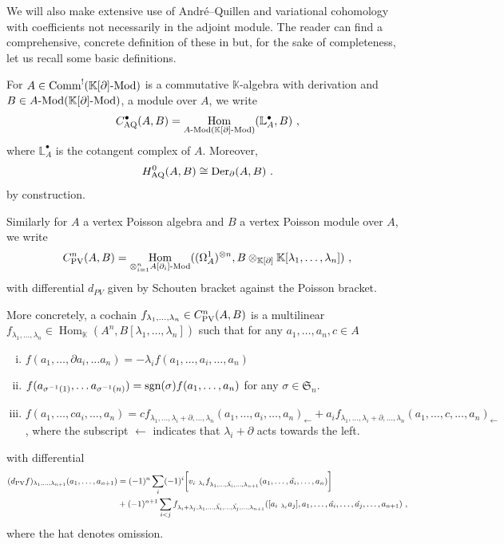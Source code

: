 \documentclass[11pt]{amsart}
\numberwithin{equation}{section}
\theoremstyle{definition}
\newcommand{\bb}{\mathbb}
\newcommand{\mf}{\mathfrak}
\newcommand{\AQ}{{\textup{AQ}}}
\DeclareMathOperator{\Hom}{Hom}
\newcommand{\Mod}{{\textup{-Mod}}}
\newcommand{\ik}{{\bb K}}
\newcommand{\Der}{{\textup{Der}}}
\newcommand{\Comm}{{\textup{Comm}}}
\newcommand{\Ss}{{{\mf{S}}}}
\newcommand{\PV}{{{\textup{PV}}}}
\newcommand{\0}{{\textbf{0}}}
\newcommand{\del}{{{\partial}}}
\def \mf{\mathfrak}
\begin{document}
We will also make extensive use of Andr\'e--Quillen and variational cohomology with coefficients not necessarily in the adjoint module. The reader can find a comprehensive, concrete definition of these in \cite{BDHKV21} but, for the sake of completeness, let us recall some basic definitions.

For $A\in\Comm^!(\ik[\del]\Mod)$ is a commutative $\ik$-algebra with derivation and $B\in A\Mod(\ik[\del]\Mod)$, a module over $A$, we write
\[
C_\AQ^\bullet(A,B) = \Hom_{A\Mod(\ik[\partial]\Mod)}(\mathbb{L}^\bullet_A,B)~,
\]
where $\mathbb{L}_A^\bullet$ is the cotangent complex of $A$. Moreover, 
\[
H^0_{\AQ}(A,B) \cong \Der_\del(A,B)~.
\]
by construction.

Similarly for $A$ a vertex Poisson algebra and $B$ a vertex Poisson module over $A$, we write
\[
C_\PV^n(A,B) = \Hom_{\otimes_{i=1}^n A[\del_i] \Mod}((\Omega_A^1)^{\otimes n},B\otimes_{\ik[\del]}\ik[\lambda_1,\dots,\lambda_n])~,
\]
with differential $d_{PV}$ given by Schouten bracket against the Poisson bracket.

More concretely, a cochain $f_{\lambda_1,\dots,\lambda_n}\in C_\PV^n(A,B)$ is a multilinear $f_{\lambda_1,\dots,\lambda_n}\in \Hom_\ik(A^n,B[\lambda_1,\dots,\lambda_n])$ such that for any $a_1,\dots,a_n,c\in A$
\begin{enumerate}[(i)]
	\item $f(a_1,\dots,\partial a_i,\dots a_n) = - \lambda_if(a_1,\dots,a_i,\dots,a_n)~$
	\item $f(a_{\sigma^{-1}(1)},\dots a_{\sigma^{-1}(n)}) = \textup{sgn}(\sigma)f(a_1,\dots,a_n)$ for any $\sigma \in \Ss_n$.
	\item $f(a_1,\dots, c a_i,\dots, a_n) = cf_{\lambda_1,\dots,\lambda_i+\del,\dots,\lambda_n}(a_1,\dots,a_i,\dots,a_n)_{\leftarrow} + a_i f_{\lambda_1,\dots,\lambda_i+\del,\dots,\lambda_n}(a_1,\dots,c,\dots,a_n)_{\leftarrow} $, where the subscript $\leftarrow$ indicates that $\lambda_i+\del$ acts towards the left.
\end{enumerate}
with differential 
\begin{align*}
(d_\PV f)_{\lambda_1,\dots,\lambda_{n+1}}(a_1,\dots,a_{n+1}) & = (-1)^n\sum_{i}(-1)^i \bigg[v_i\ _{\lambda_i} f_{\lambda_1,\dots, \hat{\lambda_i},\dots,\lambda_{n+1}}(a_1,\dots,\hat{a_i},\dots,a_n)\bigg]\\
%
& + (-1)^{n+1} \sum_{i<j}f_{\lambda_i+\lambda_j,\lambda_1, \dots,\hat{\lambda_i},\dots,\hat{\lambda_j},\dots,\lambda_{n+1}}([a_i\ _{\lambda_i}a_j],a_1,\dots,\hat{a_i},\dots,\hat{a_j},\dots,a_{n+1})~,
\end{align*}
where the hat denotes omission.
\end{document}
